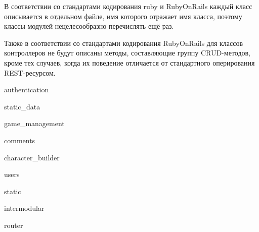 
В соответствии со стандартами кодирования ruby и RubyOnRails каждый класс описывается в отдельном файле, имя которого отражает имя класса, поэтому классы модулей нецелесообразно перечислять ещё раз.

Также в соответствии со стандартами кодирования RubyOnRails для классов контроллеров не будут описаны методы, составляющие группу CRUD-методов, кроме тех случаев, когда их поведение отличается от стандартного оперирования REST-ресурсом. 

{authentication}

{static_data}

{game_management}

{comments}

{character_builder}

{users}

{static}

{intermodular}

{router}
